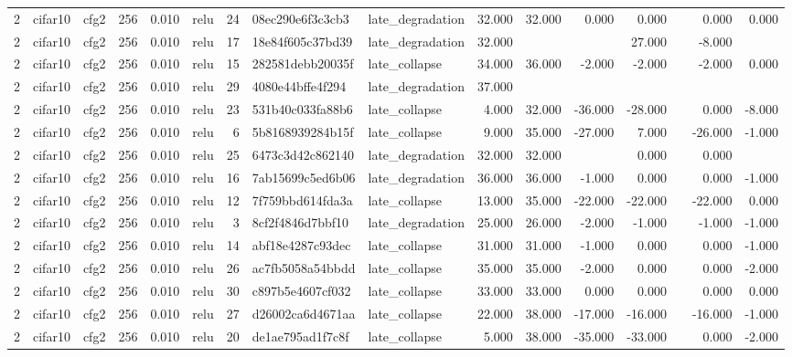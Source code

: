 \begin{table}[htbp]
{\begin{tabular}{@{}rllrrlrllrrrrrrr@{}}
2 & cifar10 & cfg2 & 256 & 0.010 & relu & 24 & 08ec290e6f3c3cb3 & late\_degradation & 32.000 & 32.000 & 0.000 & 0.000 &  & 0.000 & 0.000 \\
2 & cifar10 & cfg2 & 256 & 0.010 & relu & 17 & 18e84f605c37bd39 & late\_degradation & 32.000 &  &  & 27.000 &  & -8.000 &  \\
2 & cifar10 & cfg2 & 256 & 0.010 & relu & 15 & 282581debb20035f & late\_collapse & 34.000 & 36.000 & -2.000 & -2.000 &  & -2.000 & 0.000 \\
2 & cifar10 & cfg2 & 256 & 0.010 & relu & 29 & 4080e44bffe4f294 & late\_degradation & 37.000 &  &  &  &  &  &  \\
2 & cifar10 & cfg2 & 256 & 0.010 & relu & 23 & 531b40c033fa88b6 & late\_collapse & 4.000 & 32.000 & -36.000 & -28.000 &  & 0.000 & -8.000 \\
2 & cifar10 & cfg2 & 256 & 0.010 & relu & 6 & 5b8168939284b15f & late\_collapse & 9.000 & 35.000 & -27.000 & 7.000 &  & -26.000 & -1.000 \\
2 & cifar10 & cfg2 & 256 & 0.010 & relu & 25 & 6473c3d42c862140 & late\_degradation & 32.000 & 32.000 &  & 0.000 &  & 0.000 &  \\
2 & cifar10 & cfg2 & 256 & 0.010 & relu & 16 & 7ab15699c5ed6b06 & late\_degradation & 36.000 & 36.000 & -1.000 & 0.000 &  & 0.000 & -1.000 \\
2 & cifar10 & cfg2 & 256 & 0.010 & relu & 12 & 7f759bbd614fda3a & late\_collapse & 13.000 & 35.000 & -22.000 & -22.000 &  & -22.000 & 0.000 \\
2 & cifar10 & cfg2 & 256 & 0.010 & relu & 3 & 8cf2f4846d7bbf10 & late\_degradation & 25.000 & 26.000 & -2.000 & -1.000 &  & -1.000 & -1.000 \\
2 & cifar10 & cfg2 & 256 & 0.010 & relu & 14 & abf18e4287c93dec & late\_collapse & 31.000 & 31.000 & -1.000 & 0.000 &  & 0.000 & -1.000 \\
2 & cifar10 & cfg2 & 256 & 0.010 & relu & 26 & ac7fb5058a54bbdd & late\_collapse & 35.000 & 35.000 & -2.000 & 0.000 &  & 0.000 & -2.000 \\
2 & cifar10 & cfg2 & 256 & 0.010 & relu & 30 & c897b5e4607cf032 & late\_collapse & 33.000 & 33.000 & 0.000 & 0.000 &  & 0.000 & 0.000 \\
2 & cifar10 & cfg2 & 256 & 0.010 & relu & 27 & d26002ca6d4671aa & late\_collapse & 22.000 & 38.000 & -17.000 & -16.000 &  & -16.000 & -1.000 \\
2 & cifar10 & cfg2 & 256 & 0.010 & relu & 20 & de1ae795ad1f7c8f & late\_collapse & 5.000 & 38.000 & -35.000 & -33.000 &  & 0.000 & -2.000 \\

\end{tabular}}
\end{table}
